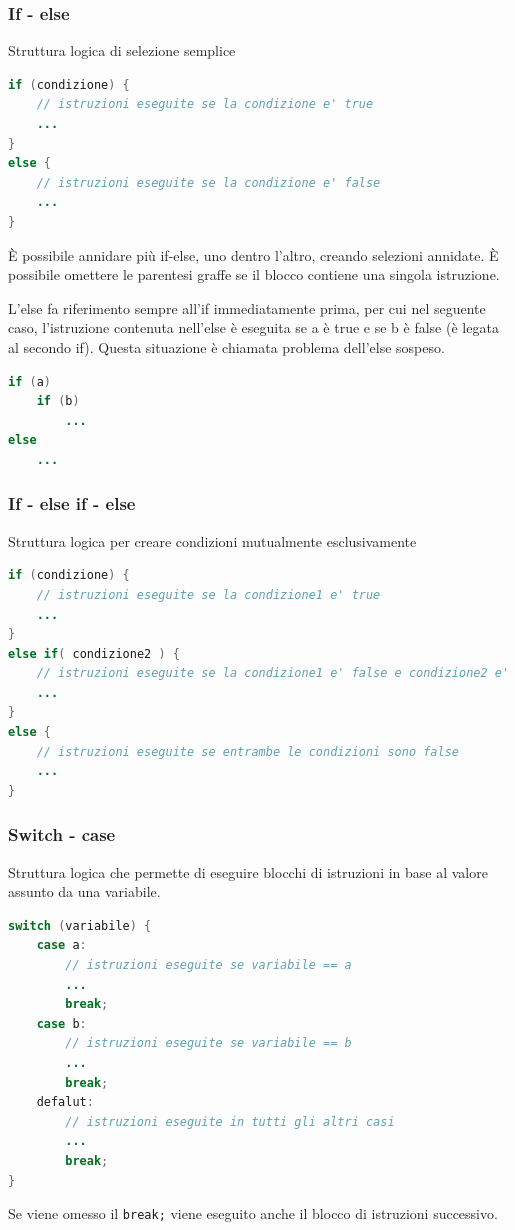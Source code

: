 \documentclass{article}
\begin{document}
\subsubsection*{If - else}
Struttura logica di selezione semplice
\begin{lstlisting}[language=Java]
if (condizione) {
	// istruzioni eseguite se la condizione e' true
	...
}
else {
	// istruzioni eseguite se la condizione e' false
	...
}
\end{lstlisting}
È possibile annidare più if-else, uno dentro l'altro, creando selezioni annidate. È possibile omettere le parentesi graffe se il
blocco contiene una singola istruzione.

L'else fa riferimento sempre all'if immediatamente prima, per cui nel seguente caso, l'istruzione contenuta nell'else è eseguita
se a è true e se b è false (è legata al secondo if). Questa situazione è chiamata problema dell'else sospeso.
\begin{lstlisting}[language=Java]
if (a)
	if (b)
		...
else
	...
\end{lstlisting}

\subsubsection*{If - else if - else}
Struttura logica per creare condizioni mutualmente esclusivamente
\begin{lstlisting}[language=Java]
if (condizione) {
	// istruzioni eseguite se la condizione1 e' true
	...
}
else if( condizione2 ) {
	// istruzioni eseguite se la condizione1 e' false e condizione2 e' true
	...
}
else {
	// istruzioni eseguite se entrambe le condizioni sono false
	...
}
\end{lstlisting}


\subsubsection*{Switch - case}
Struttura logica che permette di eseguire blocchi di istruzioni in base al valore assunto da una variabile.
\begin{lstlisting}[language=Java]
switch (variabile) {
	case a:
		// istruzioni eseguite se variabile == a
		...
		break;
	case b:
		// istruzioni eseguite se variabile == b
		...
		break;
	defalut:
		// istruzioni eseguite in tutti gli altri casi
		...
		break;
}
\end{lstlisting}
Se viene omesso il \verb|break;| viene eseguito anche il blocco di istruzioni successivo.
\end{document}

